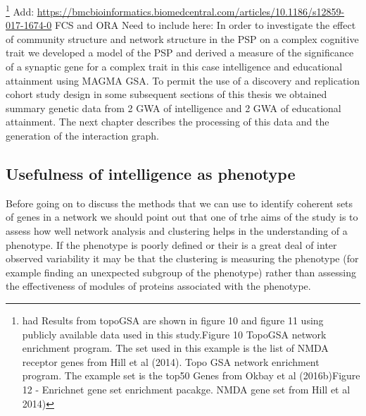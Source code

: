 
\footnote{ had Results from topoGSA are shown in figure 10 and figure 11 using publicly available data used in this study.Figure 10 TopoGSA network enrichment program. The set used in this example is the list of NMDA receptor genes from Hill et al (2014). Topo GSA network enrichment program. The example set is the top50 Genes from Okbay et al (2016b)Figure 12 - Enrichnet gene set enrichment pacakge. NMDA gene set from Hill et al 2014)}
Add:
\url{https://bmcbioinformatics.biomedcentral.com/articles/10.1186/s12859-017-1674-0} FCS and ORA
Need to include here: In order to investigate the effect of community structure and network structure in the PSP on a complex cognitive trait we developed a model of the PSP and derived a measure of the significance of a synaptic gene for a complex trait in this case intelligence and educational attainment using MAGMA GSA. To permit the use of a discovery and replication cohort study design in some subsequent sections of this thesis we obtained summary genetic data from 2 GWA of intelligence and 2 GWA of educational attainment. The next chapter describes the processing of this data and the generation of the interaction graph.

\subsection{Usefulness of intelligence as phenotype}
\label{sec:Intelligence intro usefulness of intelligence as phenotype}
Before going on to discuss the methods that we can use to identify coherent sets of genes in a network we should point out that one of trhe aims of the study is to assess how well network analysis and clustering helps in the understanding of a phenotype. If the phenotype is poorly defined or their is a great deal of inter observed variability it may be that the clustering is measuring the phenotype (for example finding an unexpected subgroup of the phenotype) rather than assessing the effectiveness of modules of proteins associated with the phenotype.
